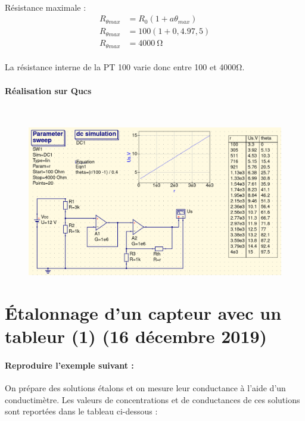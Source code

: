 \documentclass{article}
\begin{document}
\paragraph{}
Résistance maximale :
\begin{align*}
    R_{\theta max} & = R_0\left(1 + a\theta_{max} \right) \\
    R_{\theta max} & = 100\left(1 + 0,4 . 97,5\right)     \\
    R_{\theta max} & = \SI{4000}{\ohm}
\end{align*}

\paragraph{}
La résistance interne de la PT 100 varie donc entre 100 et 4000\si{\ohm}.

\newpage
\paragraph{Réalisation sur Qucs}\
\begin{figure}[H]
    \centering
    \includegraphics[width=\linewidth]{./images/003-qucs.png}
\end{figure}


\newpage
\section{Étalonnage d'un capteur avec un tableur (1) (16 décembre 2019)}

\paragraph{Reproduire l'exemple suivant : }
On prépare des solutions étalons et on mesure leur conductance à l'aide d'un conductimètre. Les valeurs de concentrations et de conductances de ces solutions sont reportées dans le tableau ci-dessous :
\end{document}
